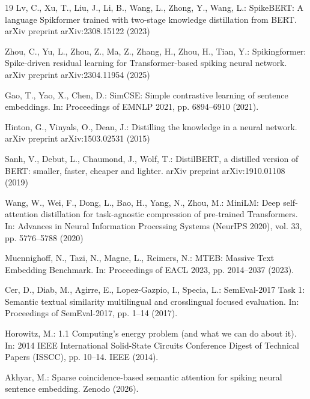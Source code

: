 \documentclass[runningheads]{llncs}
\begin{document}
\begin{thebibliography}{19}
Lv, C., Xu, T., Liu, J., Li, B., Wang, L., Zhong, Y., Wang, L.: SpikeBERT: A language Spikformer trained with two-stage knowledge distillation from BERT. arXiv preprint arXiv:2308.15122 (2023)

Zhou, C., Yu, L., Zhou, Z., Ma, Z., Zhang, H., Zhou, H., Tian, Y.: Spikingformer: Spike-driven residual learning for Transformer-based spiking neural network. arXiv preprint arXiv:2304.11954 (2025)

Gao, T., Yao, X., Chen, D.: SimCSE: Simple contrastive learning of sentence embeddings. In: Proceedings of EMNLP 2021, pp. 6894--6910 (2021). 

Hinton, G., Vinyals, O., Dean, J.: Distilling the knowledge in a neural network. arXiv preprint arXiv:1503.02531 (2015)

Sanh, V., Debut, L., Chaumond, J., Wolf, T.: DistilBERT, a distilled version of BERT: smaller, faster, cheaper and lighter. arXiv preprint arXiv:1910.01108 (2019)

Wang, W., Wei, F., Dong, L., Bao, H., Yang, N., Zhou, M.: MiniLM: Deep self-attention distillation for task-agnostic compression of pre-trained Transformers. In: Advances in Neural Information Processing Systems (NeurIPS 2020), vol. 33, pp. 5776--5788 (2020)

Muennighoff, N., Tazi, N., Magne, L., Reimers, N.: MTEB: Massive Text Embedding Benchmark. In: Proceedings of EACL 2023, pp. 2014--2037 (2023). 

Cer, D., Diab, M., Agirre, E., Lopez-Gazpio, I., Specia, L.: SemEval-2017 Task 1: Semantic textual similarity multilingual and crosslingual focused evaluation. In: Proceedings of SemEval-2017, pp. 1--14 (2017). 

Horowitz, M.: 1.1 Computing's energy problem (and what we can do about it). In: 2014 IEEE International Solid-State Circuits Conference Digest of Technical Papers (ISSCC), pp. 10--14. IEEE (2014). 

Akhyar, M.: Sparse coincidence-based semantic attention for spiking neural sentence embedding. Zenodo (2026). 

\end{thebibliography}
\end{document}
